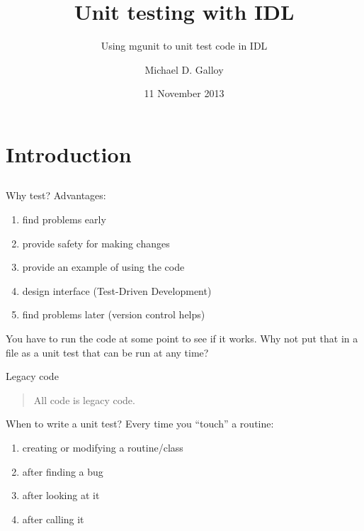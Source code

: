 \documentclass[12pt, handout]{beamer}
\title{Unit testing with IDL}
\subtitle{Using mgunit to unit test code in IDL}
\author{Michael D. Galloy}
\institute[Tech-X Corporation]{Tech-X Corporation\\ Boulder, CO}
\date{11 November 2013}
\begin{document}
\begin{frame}[plain]
  \titlepage
\end{frame}


\section{Introduction}
\subsection*{}

\begin{frame}
  \tableofcontents
\end{frame}

\begin{frame}{Why test?}
Advantages:
  \begin{enumerate}
    \item find problems early
    \item provide safety for making changes
    \item provide an example of using the code
    \item design interface (Test-Driven Development)
    \item find problems later (version control helps)
  \end{enumerate}
You have to run the code at some point to see if it works. Why not put that in a file as a unit test that can be run at any time?
\end{frame}

\begin{frame}{Legacy code}
  \begin{quote}All code is legacy code.\end{quote}
When to write a unit test? Every time you ``touch'' a routine:
  \begin{enumerate}
    \item creating or modifying a routine/class
    \item after finding a bug
    \item after looking at it
    \item after calling it
  \end{enumerate}
\end{frame}
\end{document}
